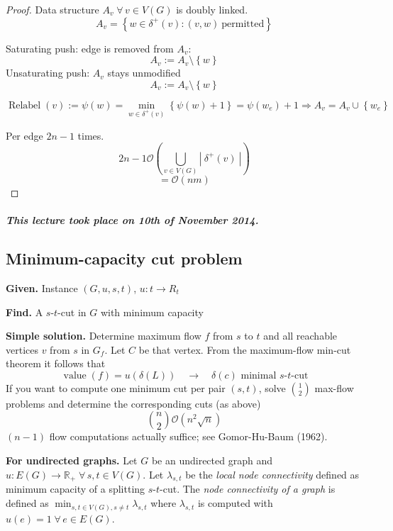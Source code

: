 \documentclass{article}
\newcommand{\card}[1]{\left|\:\!#1\:\!\right|}
\newcommand{\set}[1]{\left\{#1\right\}}
\newcommand{\given}[1]{\textbf{Given.} #1\par}
\newcommand{\find}[1]{\textbf{Find.} #1\par}
\newcommand{\dateref}[1]{\paragraph{\textit{This lecture took place on #1.}}}
\newcommand{\fall}{\;\forall\,}
\begin{document}
\begin{proof}
  Data structure $A_v \fall v \in V(G)$ is doubly linked.
  \[ A_v = \set{w \in \delta^+(v): (v, w)\ \text{permitted}} \]

  Saturating push: edge is removed from $A_v$:
  \[ A_v := A_v \setminus \set{w} \]
  Unsaturating push: $A_v$ stays unmodified
  \[ A_v := A_v \setminus \set{w} \]

  \[
    \operatorname{Relabel}(v) := \psi(w) = \min_{w\in\delta^+(v)}{\set{\psi(w) + 1}}
      = \psi(w_e) + 1
      \Rightarrow A_v = A_v \cup \set{w_e}
  \]

  Per edge $2n-1$ times.
  \[ 2n-1 \mathcal{O}(\bigcup_{v \in V(G)} \card{\delta^+(v)}) \]
  \[ = \mathcal{O}(nm) \]
\end{proof}

\dateref{10th of November 2014}

\subsection{Minimum-capacity cut problem}
\label{section-4.5}
%
\given{Instance $(G, u, s, t)$, $u: t \rightarrow R_t$}
\find{A $s$-$t$-cut in $G$ with minimum capacity}

\textbf{Simple solution.}
  Determine maximum flow $f$ from $s$ to $t$ and all reachable vertices $v$ from $s$ in $G_f$.
  Let $C$ be that vertex. From the maximum-flow min-cut theorem it follows that
  \[
    \operatorname{value}(f) = u(\delta(L)) \quad\rightarrow\quad \delta(c) \text{ minimal $s$-$t$-cut}
  \]
  If you want to compute one minimum cut per pair $(s, t)$, solve ${1 \choose 2}$ max-flow problems
  and determine the corresponding cuts (as above)
  \[
    {n \choose 2} \mathcal{O}(n^2 \sqrt{n})
  \]
  $(n-1)$ flow computations actually suffice; see Gomor-Hu-Baum (1962).

\textbf{For undirected graphs.}
  Let $G$ be an undirected graph and $u: E(G) \rightarrow \mathbb{R}_+ \fall s, t \in V(G)$.
  Let $\lambda_{s,t}$ be the \emph{local node connectivity} defined as minimum capacity of a splitting $s$-$t$-cut. The \emph{node connectivity of a graph} is defined as $\min_{s, t \in V(G), s \neq t} \lambda_{s,t}$ where $\lambda_{s,t}$ is computed with $u(e) = 1 \fall e \in E(G)$.
\end{document}
